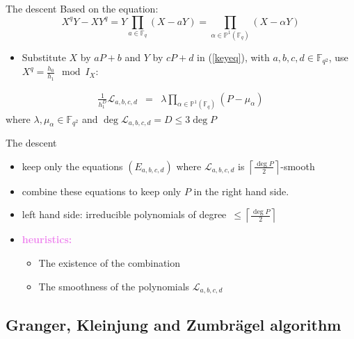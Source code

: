 \documentclass[xcolor=x11names,compress]{beamer}
\theoremstyle{break}
\theoremstyle{sc}
\theoremstyle{definition}
\theoremstyle{remark}
\begin{document}
\begin{frame}{The descent}
    Based on the equation: 
 \begin{equation}
   X^qY - XY^q = Y\prod_{a\in\mathbb{F}_q}(X - aY) =
   \prod_{\alpha\in\mathbb{P}^1(\mathbb{F}_q)}(X-\alpha Y)
   \label{keyeq}
 \end{equation}
 
 \begin{itemize}
   \item Substitute $X$ by $aP + b$ and $Y$ by $cP + d$ in (\ref{keyeq}), with
     $a, b, c, d \in \mathbb{F}_{q^2}$, use $X^q =\frac{h_0}{h_1}\mod I_X$: 

 \end{itemize}
  \begin{eqnarray*}
    \frac{1}{h_1^D}\mathcal L_{a, b, c, d} &=& \lambda
    \prod_{\alpha\in\mathbb{P}^1(\mathbb{F}_q)}(P-\mu_\alpha)
  \end{eqnarray*}
  where $\lambda, \mu_\alpha\in\mathbb{F}_{q^2}$ and $\deg\mathcal L_{a, b, c,
  d}=D\leq 3\deg P$   
\end{frame}

\begin{frame}{The descent}
  \begin{itemize}
    \item keep only the equations $(E_{a, b, c, d})$ where $\mathcal L_{a, b, c, d}$ is
  $\left\lceil \frac{\deg P}{2}\right\rceil$-smooth
\item combine these equations to keep only $P$ in the right hand side.
\item left hand side: irreducible polynomials 
  of degree~$\leq\left\lceil \frac{\deg P}{2}\right\rceil$
  \end{itemize}


  \begin{itemize}
    \item \textcolor{violet}{\textbf{heuristics:}}
      \begin{itemize}
        \item The existence of the combination
        \item The smoothness of the polynomials $\mathcal L_{a, b, c, d}$
      \end{itemize}
  \end{itemize}
\end{frame}


\subsection{Granger, Kleinjung and Zumbrägel algorithm}
\end{document}
